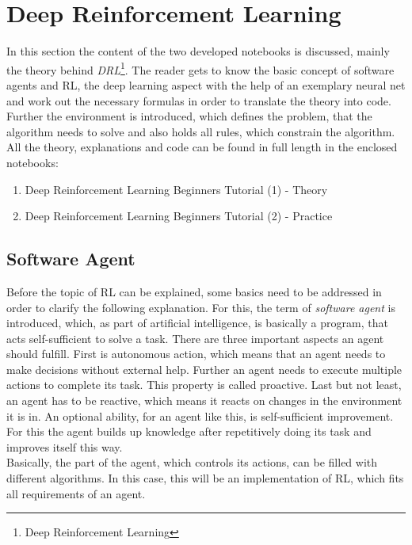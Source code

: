 \section{Deep Reinforcement Learning}
	In this section the content of the two developed notebooks is discussed, mainly the theory behind \textit{DRL}\footnote{Deep Reinforcement Learning}. The reader gets to know the basic concept of software agents and RL, the deep learning aspect with the help of an exemplary neural net and work out the necessary formulas in order to translate the theory into code. Further the environment is introduced, which defines the problem, that the algorithm needs to solve and also holds all rules, which constrain the algorithm.  All the theory, explanations and code can be found in full length in the enclosed notebooks:
	\begin{enumerate}
		\item Deep Reinforcement Learning Beginners Tutorial (1) - Theory 
		\item Deep Reinforcement Learning Beginners Tutorial (2) - Practice
	\end{enumerate}

\subsection{Software Agent}
	Before the topic of RL can be explained, some basics need to be addressed in order to clarify the following explanation.
	For this, the term of \textit{software agent} is introduced, which, as part of artificial intelligence, is basically a program, that acts self-sufficient to solve a task.
	There are three important aspects an agent should fulfill. 
	First is autonomous action, which means that an agent needs to make decisions without external help.
	Further an agent needs to execute multiple actions to complete its task. 
	This property is called proactive.
	Last but not least, an agent has to be reactive, which means it reacts on changes in the environment it is in.
	An optional ability, for an agent like this, is self-sufficient improvement. For this the agent builds up knowledge after repetitively doing its task and improves itself this way.\\
	Basically, the part of the agent, which controls its actions, can be filled with different algorithms. In this case, this will be an implementation of RL, which fits all requirements of an agent.

